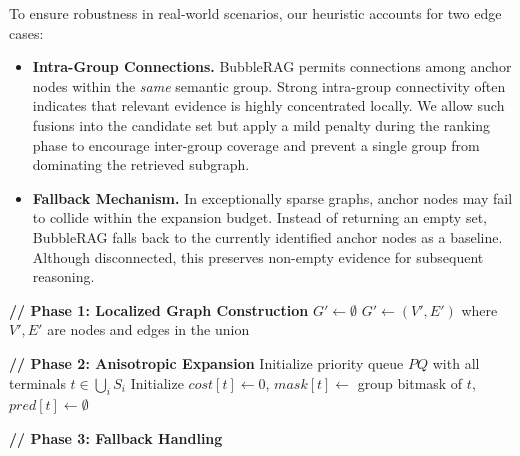 To ensure robustness in real-world scenarios, our heuristic accounts for two edge cases:
\begin{itemize}[leftmargin=*, itemsep=0.3em, topsep=0.3em]
    \item \textbf{Intra-Group Connections.} BubbleRAG permits connections among anchor nodes within the \textit{same} semantic group. Strong intra-group connectivity often indicates that relevant evidence is highly concentrated locally. We allow such fusions into the candidate set but apply a mild penalty during the ranking phase to encourage inter-group coverage and prevent a single group from dominating the retrieved subgraph.
    \item \textbf{Fallback Mechanism.} In exceptionally sparse graphs, anchor nodes may fail to collide within the expansion budget. Instead of returning an empty set, BubbleRAG falls back to the currently identified anchor nodes as a baseline. Although disconnected, this preserves non-empty evidence for subsequent reasoning.
\end{itemize}


\begin{algorithm}[t]
\DontPrintSemicolon
{}


\BlankLine
\textbf{// Phase 1: Localized Graph Construction}
$G' \gets \emptyset$\;
$G' \gets (V', E')$ where $V',E'$ are nodes and edges in the union\;

\textbf{// Phase 2: Anisotropic Expansion}
Initialize priority queue $PQ$ with all terminals $t \in \bigcup_i S_i$\;
Initialize $cost[t] \gets 0$, $mask[t] \gets$ group bitmask of $t$, $pred[t] \gets \emptyset$\;

\textbf{// Phase 3: Fallback Handling}

\caption{Bubble Expansion Algorithm}
\label{algo:bubble}
\end{algorithm}


